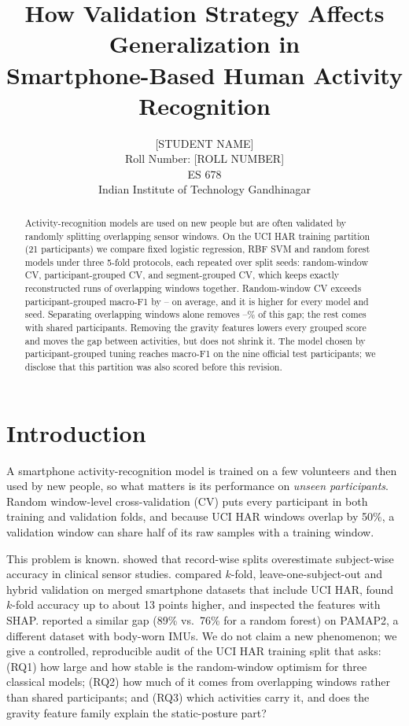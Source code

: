 \documentclass{article}
\title{How Validation Strategy Affects Generalization in\\Smartphone-Based Human Activity Recognition}
\author{%
  [STUDENT NAME] \\
  Roll Number: [ROLL NUMBER] \\
  ES 678 \\
  Indian Institute of Technology Gandhinagar
}
\begin{document}
\maketitle

\begin{abstract}
Activity-recognition models are used on new people but are often validated by randomly splitting overlapping sensor windows. On the UCI HAR training partition (21 participants) we compare fixed logistic regression, RBF SVM and random forest models under three 5-fold protocols, each repeated over \Nnseeds{} split seeds: random-window CV, participant-grouped CV, and segment-grouped CV, which keeps exactly reconstructed runs of overlapping windows together. Random-window CV exceeds participant-grouped macro-F1 by \Ngapmodelmin--\Ngapmodelmax{} on average, and it is higher for every model and seed. Separating overlapping windows alone removes \Noverlapsharemin--\Noverlapsharemax\% of this gap; the rest comes with shared participants. Removing the gravity features lowers every grouped score and moves the gap between activities, but does not shrink it. The model chosen by participant-grouped tuning reaches macro-F1 \Ntestf{} on the nine official test participants; we disclose that this partition was also scored before this revision.
\end{abstract}

\section{Introduction}
A smartphone activity-recognition model is trained on a few volunteers and then used by new people, so what matters is its performance on \emph{unseen participants}. Random window-level cross-validation (CV) puts every participant in both training and validation folds, and because UCI HAR windows overlap by 50\%, a validation window can share half of its raw samples with a training window.

This problem is known. \citet{saeb2017} showed that record-wise splits overestimate subject-wise accuracy in clinical sensor studies. \citet{braganca2022} compared $k$-fold, leave-one-subject-out and hybrid validation on merged smartphone datasets that include UCI HAR, found $k$-fold accuracy up to about 13 points higher, and inspected the features with SHAP. \citet{rehman2024} reported a similar gap (89\% vs.\ 76\% for a random forest) on PAMAP2, a different dataset with body-worn IMUs. We do not claim a new phenomenon; we give a controlled, reproducible audit of the UCI HAR training split that asks: (RQ1) how large and how stable is the random-window optimism for three classical models; (RQ2) how much of it comes from overlapping windows rather than shared participants; and (RQ3) which activities carry it, and does the gravity feature family explain the static-posture part?
\end{document}
